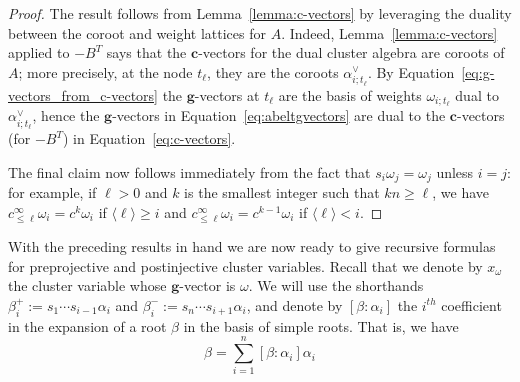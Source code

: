 \documentclass[12pt]{amsart}
\newcommand{\bfc}{\mathbf{c}}
\newcommand{\bfg}{\mathbf{g}}
\newcommand{\cv}{\alpha}
\newcommand{\gv}{\omega}
\renewcommand{\mod}[1]{\langle {#1} \rangle}
\newcommand{\Zidx}{\ell}
\theoremstyle{remark}
\numberwithin{equation}{section}
\numberwithin{figure}{section}
\begin{document}
\begin{proof}
  The result follows from Lemma~\ref{lemma:c-vectors} by leveraging the duality between the coroot and weight lattices for $A$.
  Indeed, Lemma~\ref{lemma:c-vectors} applied to $-B^T$ says that the $\bfc$-vectors for the dual cluster algebra are coroots of $A$; more precisely, at the node $t_\Zidx$, they are the coroots $\cv_{i;t_\Zidx}^\vee$.
  By Equation~\eqref{eq:g-vectors_from_c-vectors} the $\bfg$-vectors at $t_\Zidx$ are the basis of weights $\gv_{i;t_\Zidx}$ dual to $\cv_{i;t_\Zidx}^\vee$, hence the $\bfg$-vectors in Equation~\eqref{eq:abeltgvectors} are dual to the $\bfc$-vectors (for $-B^T$) in Equation~\eqref{eq:c-vectors}.

  The final claim now follows immediately from the fact that $s_i \omega_j = \omega_j$ unless $i =j$: for example, if $\Zidx > 0$ and $k$ is the smallest integer such that $kn \geq \Zidx$, we have $c^\infty_{\leq \Zidx} \omega_i =  c^k\omega_i$ if $\mod{\Zidx} \geq i$ and $c^\infty_{\leq \Zidx} \omega_i = c^{k-1}\omega_i$ if $\mod{\Zidx} < i$. 
\end{proof}

With the preceding results in hand we are now ready to give recursive formulas for preprojective and postinjective cluster variables.
Recall that we denote by $x_\omega$ the cluster variable whose $\bfg$-vector is $\omega$.
We will use the shorthands $\beta_i^+:=s_1\cdots s_{i-1}\alpha_i$ and $\beta_i^-:=s_n\cdots s_{i+1}\alpha_i$, and denote by $[\beta:\alpha_i]$ the $i^{th}$ coefficient in the expansion of a root $\beta$ in the basis of simple roots. That is, we have
\[
\beta = \sum_{i=1}^n [\beta:\alpha_i]\alpha_i
\]
\end{document}
